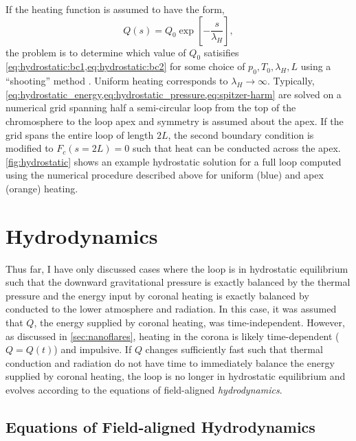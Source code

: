 If the heating function is assumed to have the form,
\begin{equation*}
    Q(s) = Q_0\exp{\left[-\frac{s}{\lambda_H}\right]},
\end{equation*}
the problem is to determine which value of $Q_0$ satisifies \cref{eq:hydrostatic:bc1,eq:hydrostatic:bc2} for some choice of $p_0,T_0,\lambda_H,L$ using a ``shooting'' method \citep[see Section 17.1 of][]{press_numerical_1992}. Uniform heating corresponds to $\lambda_H\to\infty$. Typically, \cref{eq:hydrostatic_energy,eq:hydrostatic_pressure,eq:spitzer-harm} are solved on a numerical grid spanning half a semi-circular loop from the top of the chromosphere to the loop apex and symmetry is assumed about the apex. If the grid spans the entire loop of length $2L$, the second boundary condition is modified to $F_c(s=2L)=0$ such that heat can be conducted across the apex. \autoref{fig:hydrostatic} shows an example hydrostatic solution for a full loop computed using the numerical procedure described above for uniform (blue) and apex (orange) heating.

\section{Hydrodynamics}\label{sec:hydrodynamics}

Thus far, I have only discussed cases where the loop is in hydrostatic equilibrium such that the downward gravitational pressure is exactly balanced by the thermal pressure and the energy input by coronal heating is exactly balanced by conducted to the lower atmosphere and radiation. In this case, it was assumed that $Q$, the energy supplied by coronal heating, was time-independent. However, as discussed in \autoref{sec:nanoflares}, heating in the corona is likely time-dependent ($Q=Q(t)$) and impulsive. If $Q$ changes sufficiently fast such that thermal conduction and radiation do not have time to immediately balance the energy supplied by coronal heating, the loop is no longer in hydrostatic equilibrium and evolves according to the equations of field-aligned \textit{hydrodynamics}.

\subsection{Equations of Field-aligned Hydrodynamics}\label{sec:hydrodynamic-equations}

